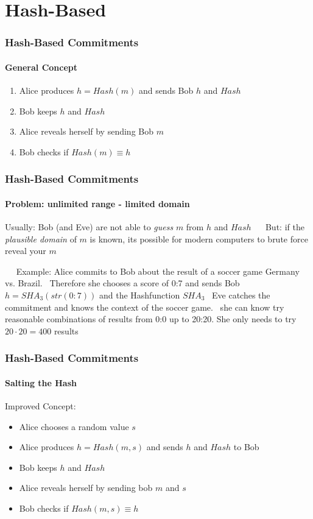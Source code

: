 \section{Hash-Based}
\begin{frame}
	\frametitle{Hash-Based Commitments}
	\framesubtitle{General Concept}
	
	\begin{enumerate}
		\item Alice produces $h = Hash(m)$ and sends Bob $h$ and $Hash$
		\item Bob keeps $h$ and $Hash$
		\item Alice reveals herself by sending Bob $m$
		\item Bob checks if $Hash(m) \equiv h$
	\end{enumerate}
	
\end{frame}

\begin{frame}
	\frametitle{Hash-Based Commitments}
	\framesubtitle{Problem: unlimited range - limited domain}
	Usually: Bob (and Eve) are not able to \textit{guess} $m$ from $h$ and $Hash$
	~\newline ~\newline
	But: if the \textit{plausible domain} of $m$ is known, its possible for modern computers to brute force reveal your $m$ 
	
	~\newline ~\newline 
	Example: Alice commits to Bob about the result of a soccer game Germany vs. Brazil. ~\newline Therefore she chooses a score of 0:7 and sends Bob $h = SHA_3(str(0:7))$ and the Hashfunction $SHA_3$ ~\newline Eve catches the commitment and knows the context of the soccer game. ~\newline she can know try reasonable combinations of results from 0:0 up to 20:20. She only needs to try $20 \cdot 20 = 400$ results 
\end{frame}

\begin{frame}
	\frametitle{Hash-Based Commitments}
	\framesubtitle{Salting the Hash}
	Improved Concept: 
	\begin{itemize}
		\item Alice chooses a random value $s$
		\item Alice produces $h = Hash(m,s)$ and sends $h$ and $Hash$ to Bob
		\item Bob keeps $h$ and $Hash$
		\item Alice reveals herself by sending bob $m$ and $s$
		\item Bob checks if $Hash(m,s) \equiv h$
	\end{itemize}
\end{frame}